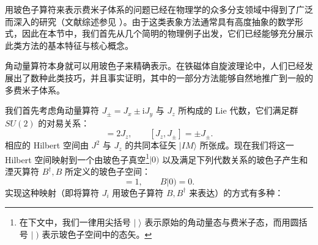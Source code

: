 用玻色子算符来表示费米子体系的问题已经在物理学的众多分支领域中得到了广泛而深入的研究（文献综述参见 \cite{Ga78}）。由于这类表象方法通常具有高度抽象的数学形式，因此在本节中，我们首先从几个简明的物理例子出发，它们已经能够充分展示此类方法的基本特征与核心概念。

角动量算符本身就可以用玻色子来精确表示。在铁磁体自旋波理论中，人们已经发展出了数种此类技巧，并且事实证明，其中的一部分方法能够自然地推广到一般的多费米子体系。

我们首先考虑角动量算符 $J_{\pm}=J_{x}\pm\mathrm{i}J_{y}$ 与 $J_{z}$ 所构成的 Lie
代数，它们满足群 $SU(2)$ 的对易关系：
\begin{equation}
[J_{+},J_{-}]=2J_{z},\qquad[J_{z},J_{\pm}]=\pm J_{\pm}.\label{eq:9.2}
\end{equation}
相应的 Hilbert 空间由 $J^{2}$ 与 $J_{z}$ 的共同本征矢 $|IM\rangle$ 所张成。现在我们将这一
Hilbert 空间映射到一个由玻色子真空\footnote{在下文中，我们一律用尖括号 $|\;\rangle$ 表示原始的角动量态与费米子态，而用圆括号 $|\;)$ 表示玻色子空间中的态矢。}$|0)$
以及满足下列代数关系的玻色子产生和湮灭算符 $B^{\dagger},B$ 所定义的玻色子空间：
\begin{equation}
[B,B^{\dagger}]=1,\qquad B|0)=0.\label{eq:9.3}
\end{equation}
实现这种映射（即将算符 $J_{i}$ 用玻色子算符 $B,B^{\dagger}$ 来表达）的方式有多种：
